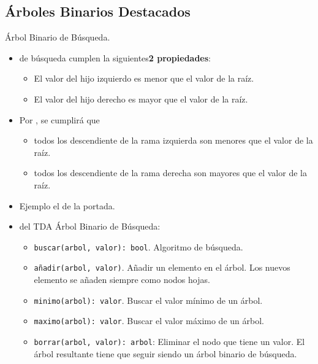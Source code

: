 \documentclass[10pt,envcountsect,spanish]{beamer}
\begin{document}
\subsection{Árboles Binarios Destacados}



\begin{frame}{Árbol Binario de Búsqueda.}


\begin{itemize}
\item {} de búsqueda cumplen la siguientes\textbf{2 propiedades}:
\begin{itemize}
\item El valor del hijo izquierdo es menor que el valor de la raíz.
\item El valor del hijo derecho es mayor que el valor de la raíz.
\end{itemize}

\item Por , se cumplirá que
\begin{itemize}
\item todos los descendiente de la rama izquierda son menores que el valor de la raíz.
\item todos los descendiente de la rama derecha son mayores que el valor de la raíz.
\end{itemize}


\item Ejemplo el de la portada.

\item {} del TDA Árbol Binario de Búsqueda:


\begin{itemize}
\item \texttt{buscar(arbol, valor): bool}. Algoritmo de búsqueda.

\item  \texttt{añadir(arbol, valor)}. Añadir un elemento en el árbol. Los nuevos elemento se añaden siempre como nodos hojas. 
	
\item   \texttt{minimo(arbol): valor}. Buscar el valor mínimo de un árbol.

\item \texttt{maximo(arbol): valor}. Buscar el valor máximo de un árbol.
	
	
\item  \texttt{borrar(arbol, valor): arbol}: Eliminar el nodo que tiene un valor. El árbol resultante tiene que seguir siendo un árbol binario de búsqueda.

\end{itemize}

\end{itemize}

\end{frame}
\end{document}
